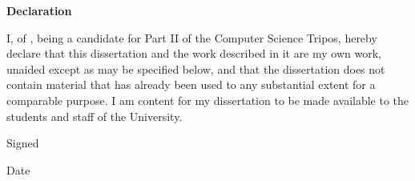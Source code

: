 {\Large \bf Declaration}

\vspace{6pt}

I, \authorname of \authorcollege, being a candidate for Part II of the Computer Science
Tripos, hereby declare that this dissertation and the work described in it are
my own work, unaided except as may be specified below, and that the
dissertation does not contain material that has already been used to any
substantial extent for a comparable purpose. I am content for my dissertation
to be made available to the students and staff of the University.

Signed \authorname

Date \signaturedate

\vfill

\vspace*{\fill}
